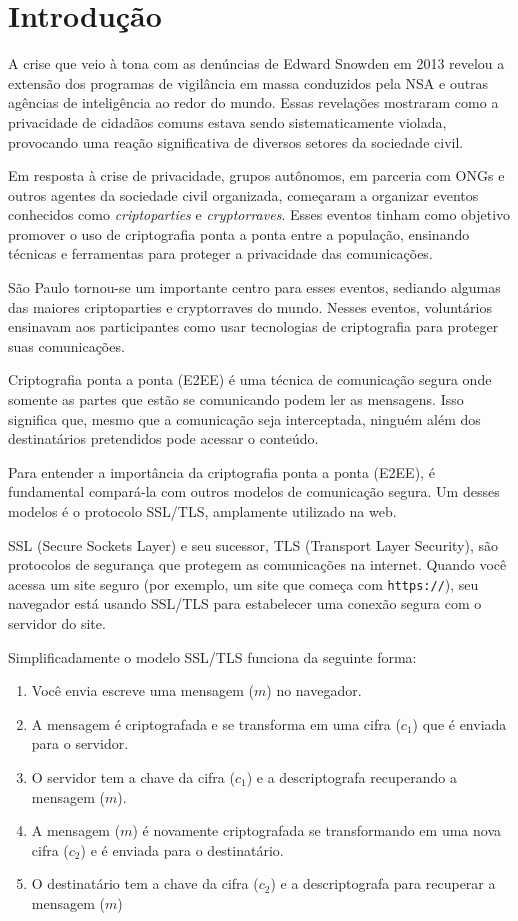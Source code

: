 \chapter{Introdução}
\label{cha:introducao}

A crise que veio à tona com as denúncias de Edward Snowden em 2013 revelou a extensão dos programas de vigilância em massa conduzidos pela NSA e outras agências de inteligência ao redor do mundo.
Essas revelações mostraram como a privacidade de cidadãos comuns estava sendo sistematicamente violada, provocando uma reação significativa de diversos setores da sociedade civil.

Em resposta à crise de privacidade, grupos autônomos, em parceria com ONGs e outros agentes da sociedade civil organizada, começaram a organizar eventos conhecidos como {\em criptoparties} e {\em cryptorraves}.
Esses eventos tinham como objetivo promover o uso de criptografia ponta a ponta entre a população, ensinando técnicas e ferramentas para proteger a privacidade das comunicações.

São Paulo tornou-se um importante centro para esses eventos, sediando algumas das maiores criptoparties e cryptorraves do mundo.
Nesses eventos, voluntários ensinavam aos participantes como usar tecnologias de criptografia para proteger suas comunicações.

Criptografia ponta a ponta (E2EE) é uma técnica de comunicação segura onde somente as partes que estão se comunicando podem ler as mensagens.
Isso significa que, mesmo que a comunicação seja interceptada, ninguém além dos destinatários pretendidos pode acessar o conteúdo.

Para entender a importância da criptografia ponta a ponta (E2EE), é fundamental compará-la com outros modelos de comunicação segura.
Um desses modelos é o protocolo SSL/TLS, amplamente utilizado na web.

SSL (Secure Sockets Layer) e seu sucessor, TLS (Transport Layer Security), são protocolos de segurança que protegem as comunicações na internet.
Quando você acessa um site seguro (por exemplo, um site que começa com {\tt https://}), seu navegador está usando SSL/TLS para estabelecer uma conexão segura com o servidor do site.

Simplificadamente o modelo SSL/TLS funciona da seguinte forma:

\begin{enumerate}
\item Você envia escreve uma mensagem ($m$) no navegador.
\item A mensagem é criptografada e se transforma em uma cifra ($c_1$) que é enviada para o servidor.
\item O servidor tem a chave da cifra ($c_1$) e a descriptografa recuperando a mensagem ($m$).
\item A mensagem ($m$) é novamente criptografada se transformando em uma nova cifra ($c_2$) e é enviada para o destinatário.
\item O destinatário tem a chave da cifra ($c_2$) e a descriptografa para recuperar a mensagem ($m$)
\end{enumerate}

